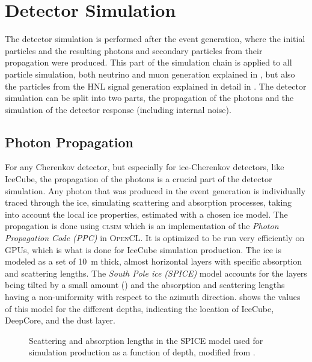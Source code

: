 \section{Detector Simulation}

The detector simulation is performed after the event generation, where the initial particles and the resulting photons and secondary particles from their propagation were produced. This part of the simulation chain is applied to all particle simulation, both neutrino and muon generation explained in , but also the particles from the HNL signal generation explained in detail in . The detector simulation can be split into two parts, the propagation of the photons and the simulation of the detector response (including internal noise).


\subsection{Photon Propagation}

For any Cherenkov detector, but especially for ice-Cherenkov detectors, like IceCube, the propagation of the photons is a crucial part of the detector simulation. Any photon that was produced in the event generation is individually traced through the ice, simulating scattering and absorption processes, taking into account the local ice properties, estimated with a chosen ice model. The propagation is done using \textsc{clsim} \cite{clsim} which is an implementation of the \textit{Photon Propagation Code (\textsc{PPC})}  in \textsc{OpenCL}. It is optimized to be run very efficiently on GPUs, which is what is done for IceCube simulation production. The ice is modeled as a set of \SI{10}{\meter} thick, almost horizontal layers with specific absorption and scattering lengths. The \textit{South Pole ice (SPICE)} model  accounts for the layers being tilted by a small amount () and the absorption and scattering lengths having a non-uniformity with respect to the azimuth direction.  shows the values of this model for the different depths, indicating the location of IceCube, DeepCore, and the dust layer.

\begin{figure}
    
	\caption[Depth dependent scattering and absorption lengths]{Scattering and absorption lengths in the SPICE model used for simulation production as a function of depth, modified from \cite{ATrettin_phd}.}
\end{figure}

